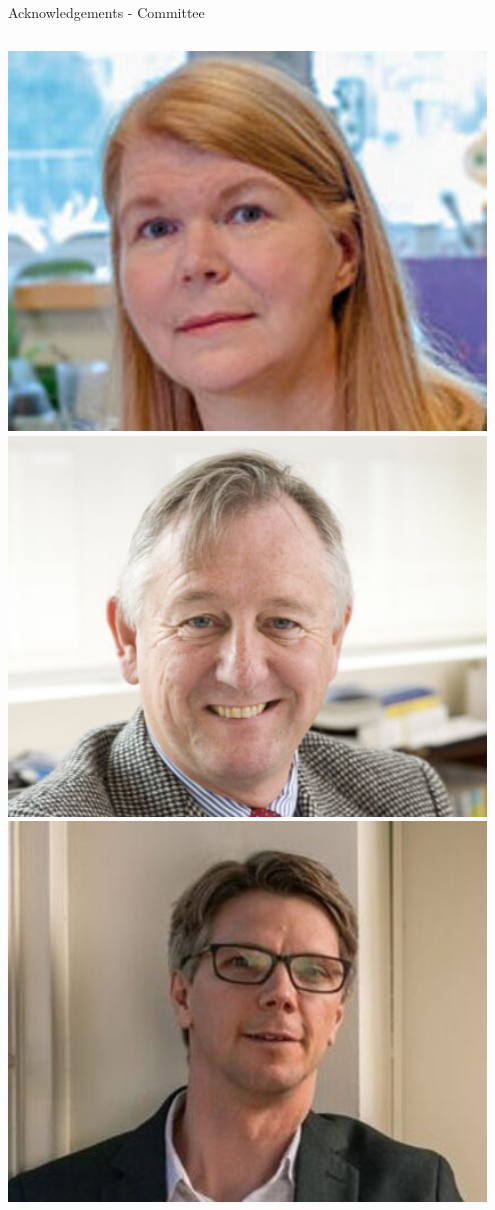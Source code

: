 \documentclass[aspectratio=169]{beamer}
\begin{document}
\begin{frame}{Acknowledgements - Committee}
    \begin{columns}
            \centering
            \includegraphics[width=0.95\textwidth]{people/milnergroup/janet2.png}
            \includegraphics[width=0.95\textwidth]{people/milnergroup/richard.png}
            \includegraphics[width=0.95\textwidth]{people/milnergroup/detmold.png}

\end{columns}
\end{frame}
\end{document}

